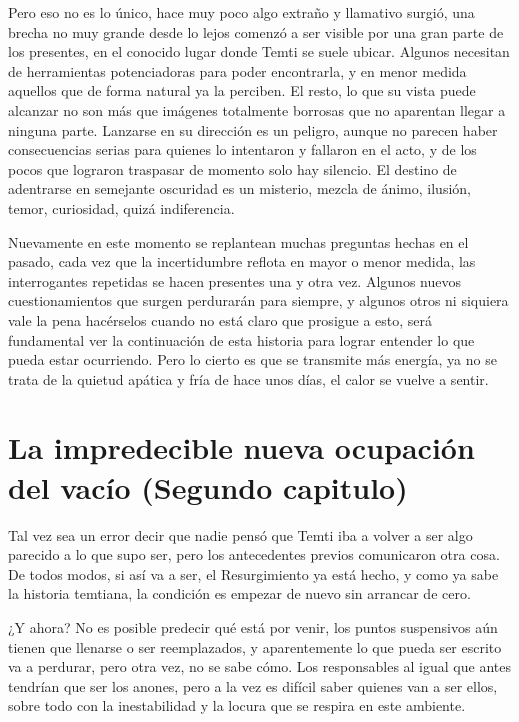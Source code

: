 \documentclass[
  spanish,
]{book}
\begin{document}
Pero eso no es lo único, hace muy poco algo extraño y llamativo surgió, una brecha no muy grande desde lo lejos comenzó a ser visible por una gran parte de los presentes, en el conocido lugar donde Temti se suele ubicar. Algunos necesitan de herramientas potenciadoras para poder encontrarla, y en menor medida aquellos que de forma natural ya la perciben. El resto, lo que su vista puede alcanzar no son más que imágenes totalmente borrosas que no aparentan llegar a ninguna parte.
Lanzarse en su dirección es un peligro, aunque no parecen haber consecuencias serias para quienes lo intentaron y fallaron en el acto, y de los pocos que lograron traspasar de momento solo hay silencio. El destino de adentrarse en semejante oscuridad es un misterio, mezcla de ánimo, ilusión, temor, curiosidad, quizá indiferencia.

Nuevamente en este momento se replantean muchas preguntas hechas en el pasado, cada vez que la incertidumbre reflota en mayor o menor medida, las interrogantes repetidas se hacen presentes una y otra vez. Algunos nuevos cuestionamientos que surgen perdurarán para siempre, y algunos otros ni siquiera vale la pena hacérselos cuando no está claro que prosigue a esto, será fundamental ver la continuación de esta historia para lograr entender lo que pueda estar ocurriendo. Pero lo cierto es que se transmite más energía, ya no se trata de la quietud apática y fría de hace unos días, el calor se vuelve a sentir.

\hypertarget{la-impredecible-nueva-ocupaciuxf3n-del-vacuxedo-segundo-capitulo}{%
\chapter{La impredecible nueva ocupación del vacío (Segundo capitulo)}\label{la-impredecible-nueva-ocupaciuxf3n-del-vacuxedo-segundo-capitulo}}

Tal vez sea un error decir que nadie pensó que Temti iba a volver a ser algo parecido a lo que supo ser, pero los antecedentes previos comunicaron otra cosa. De todos modos, si así va a ser, el Resurgimiento ya está hecho, y como ya sabe la historia temtiana, la condición es empezar de nuevo sin arrancar de cero.

¿Y ahora?
No es posible predecir qué está por venir, los puntos suspensivos aún tienen que llenarse o ser reemplazados, y aparentemente lo que pueda ser escrito va a perdurar, pero otra vez, no se sabe cómo. Los responsables al igual que antes tendrían que ser los anones, pero a la vez es difícil saber quienes van a ser ellos, sobre todo con la inestabilidad y la locura que se respira en este ambiente.
\end{document}
